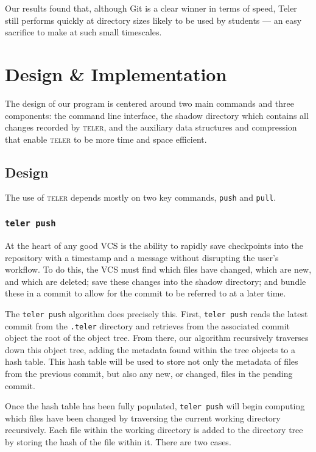 \documentclass[11pt, letterpaper]{article}
\begin{document}
\begin{multicols}{2}
  Our results found that, although Git is a clear winner in terms of
  speed, Teler still performs quickly at directory sizes likely to
  be used by students --- an easy sacrifice to make at such small
  timescales.

  \section{Design \& Implementation}
  \label{sec:desimp}
  The design of our program is centered around two main commands and
  three components: the command line interface, the shadow directory
  which contains all changes recorded by \textsc{teler}, and the
  auxiliary data structures and compression that enable \textsc{teler}
  to be more time and space efficient.

  \subsection{Design}
  \label{subsec:design}
  The use of \textsc{teler} depends mostly on two key commands,
  \texttt{push} and \texttt{pull}.

  \subsubsection{\texttt{teler push}}
  \label{subsubsec:push}
  At the heart of any good VCS is the ability to rapidly save
  checkpoints into the repository with a timestamp and a message
  without disrupting the user's workflow. To do this, the VCS must
  find which files have changed, which are new, and which are deleted;
  save these changes into the shadow directory; and bundle these in a
  commit to allow for the commit to be referred to at a later time.

  The \texttt{teler push} algorithm does precisely this. First,
  \texttt{teler push} reads the latest commit from the \texttt{.teler}
  directory and retrieves from the associated commit object the root
  of the object tree. From there, our algorithm recursively traverses
  down this object tree, adding the metadata found within the tree
  objects to a hash table. This hash table will be used to store not only
  the metadata of files from the previous commit, but also any
  new, or changed, files in the pending commit.

  Once the hash table has been fully populated, \texttt{teler push}
  will begin computing which files have been changed by traversing the
  current working directory recursively. Each file within the working
  directory is added to the directory tree by storing the hash of the
  file within it. There are two cases.


\end{multicols}
\end{document}
